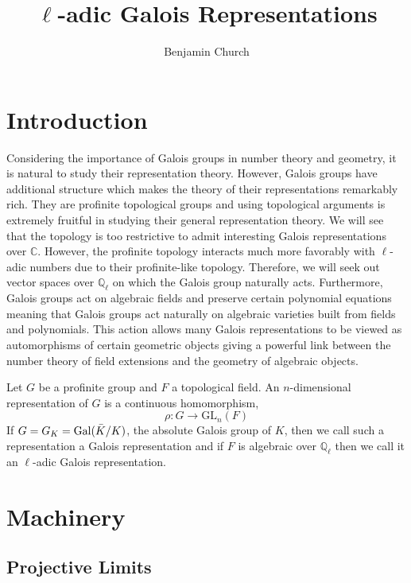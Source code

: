 \documentclass[12pt]{article}
\newcommand{\C}{\mathbb{C}}
\newcommand{\Q}{\mathbb{Q}}
\newcommand{\Gal}[1]{\mathrm{Gal} \small(#1 \small)}
\newcommand{\GL}[2]{\mathrm{GL}_{#1}(#2)}
\theoremstyle{remark}
\theoremstyle{definition}
\newenvironment{definition}[1][Definition:]{\begin{trivlist}
\item[\hskip \labelsep {\bfseries #1}]}{\end{trivlist}}
\begin{document}
\title{\Huge{$\ell$-adic Galois Representations}}
\author{Benjamin Church}
\maketitle
\tableofcontents
\newpage

\section{Introduction}

Considering the importance of Galois groups in number theory and geometry, it is natural to study their representation theory. However, Galois groups have additional structure which makes the theory of their representations remarkably rich. They are profinite topological groups and using topological arguments is extremely fruitful in studying their general representation theory. We will see that the topology is too restrictive to admit interesting Galois representations over $\C$. However, the profinite topology interacts much more favorably with $\ell$-adic numbers due to their profinite-like topology. Therefore, we will seek out vector spaces over $\Q_{\ell}$ on which the Galois group naturally acts. Furthermore, Galois groups act on algebraic fields and preserve certain polynomial equations meaning that Galois groups act naturally on algebraic varieties built from fields and polynomials. This action allows many Galois representations to be viewed as automorphisms of certain geometric objects giving a powerful link between the number theory of field extensions and the geometry of algebraic objects.  

\begin{definition}
Let $G$ be a profinite group and $F$ a topological field. An $n$-dimensional representation of $G$ is a continuous homomorphism,
\[ \rho : G \to \GL{n}{F} \] 
If $G = G_K = \Gal{\bar{K} / K}$, the absolute Galois group of $K$, then we call such a representation a Galois representation and if $F$ is algebraic over $\Q_{\ell}$ then we call it an $\ell$-adic Galois representation.  
\end{definition}

\section{Machinery}

\subsection{Projective Limits}
\end{document}
